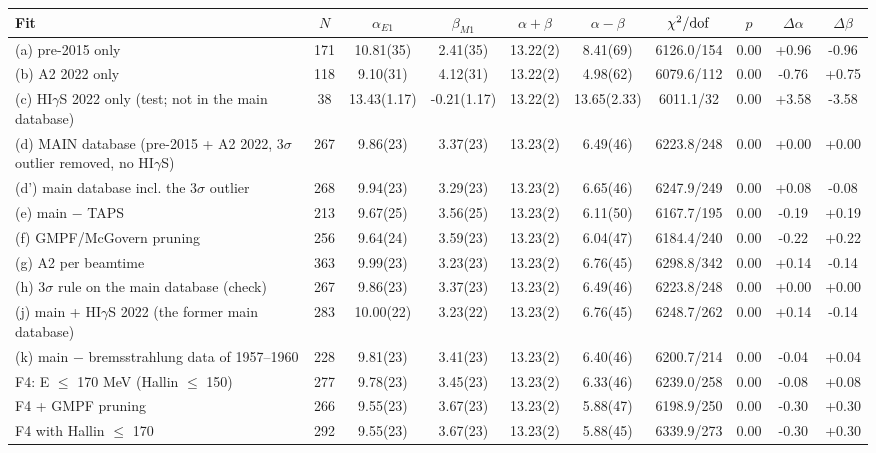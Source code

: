 \begin{tabular}{lccccccccc}
\hline
Fit & $N$ & $\alpha_{E1}$ & $\beta_{M1}$ & $\alpha+\beta$ & $\alpha-\beta$ & $\chi^2/{\rm dof}$ & $p$ & $\Delta\alpha$ & $\Delta\beta$ \\
\hline
(a) pre-2015 only & 171 & 10.81(35) & 2.41(35) & 13.22(2) & 8.41(69) & 6126.0/154 & 0.00 & +0.96 & -0.96 \\
(b) A2 2022 only & 118 & 9.10(31) & 4.12(31) & 13.22(2) & 4.98(62) & 6079.6/112 & 0.00 & -0.76 & +0.75 \\
(c) HI$\gamma$S 2022 only (test; not in the main database) & 38 & 13.43(1.17) & -0.21(1.17) & 13.22(2) & 13.65(2.33) & 6011.1/32 & 0.00 & +3.58 & -3.58 \\
(d) MAIN database (pre-2015 + A2 2022, 3$\sigma$ outlier removed, no HI$\gamma$S) & 267 & 9.86(23) & 3.37(23) & 13.23(2) & 6.49(46) & 6223.8/248 & 0.00 & +0.00 & +0.00 \\
(d') main database incl. the 3$\sigma$ outlier & 268 & 9.94(23) & 3.29(23) & 13.23(2) & 6.65(46) & 6247.9/249 & 0.00 & +0.08 & -0.08 \\
(e) main $-$ TAPS & 213 & 9.67(25) & 3.56(25) & 13.23(2) & 6.11(50) & 6167.7/195 & 0.00 & -0.19 & +0.19 \\
(f) GMPF/McGovern pruning & 256 & 9.64(24) & 3.59(23) & 13.23(2) & 6.04(47) & 6184.4/240 & 0.00 & -0.22 & +0.22 \\
(g) A2 per beamtime & 363 & 9.99(23) & 3.23(23) & 13.23(2) & 6.76(45) & 6298.8/342 & 0.00 & +0.14 & -0.14 \\
(h) 3$\sigma$ rule on the main database (check) & 267 & 9.86(23) & 3.37(23) & 13.23(2) & 6.49(46) & 6223.8/248 & 0.00 & +0.00 & +0.00 \\
(j) main + HI$\gamma$S 2022 (the former main database) & 283 & 10.00(22) & 3.23(22) & 13.23(2) & 6.76(45) & 6248.7/262 & 0.00 & +0.14 & -0.14 \\
(k) main $-$ bremsstrahlung data of 1957–1960 & 228 & 9.81(23) & 3.41(23) & 13.23(2) & 6.40(46) & 6200.7/214 & 0.00 & -0.04 & +0.04 \\
F4: E $\le$ 170 MeV (Hallin $\le$ 150) & 277 & 9.78(23) & 3.45(23) & 13.23(2) & 6.33(46) & 6239.0/258 & 0.00 & -0.08 & +0.08 \\
F4 + GMPF pruning & 266 & 9.55(23) & 3.67(23) & 13.23(2) & 5.88(47) & 6198.9/250 & 0.00 & -0.30 & +0.30 \\
F4 with Hallin $\le$ 170 & 292 & 9.55(23) & 3.67(23) & 13.23(2) & 5.88(45) & 6339.9/273 & 0.00 & -0.30 & +0.30 \\
\hline
\end{tabular}

